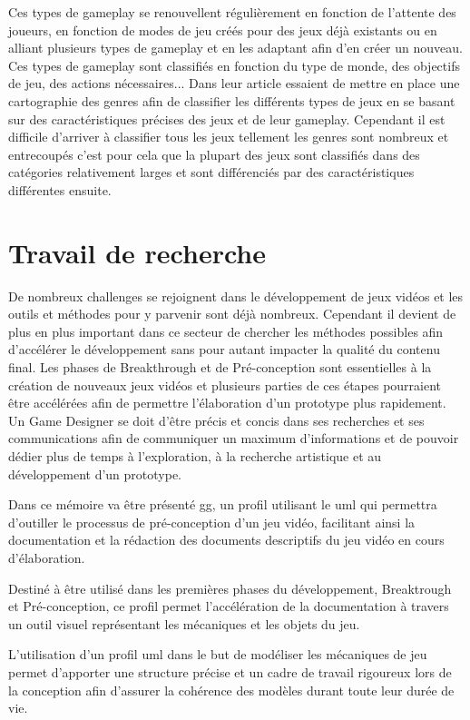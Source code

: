 Ces types de gameplay se renouvellent régulièrement en fonction de l'attente des joueurs, en fonction de modes de jeu créés pour des jeux déjà existants ou en alliant plusieurs types de gameplay et en les adaptant afin d'en créer un nouveau. Ces types de gameplay sont classifiés en fonction du type de monde, des objectifs de jeu, des actions nécessaires... Dans leur article \cite{HeintzStephanie2015TGGM} essaient de mettre en place une cartographie des genres afin de classifier les différents types de jeux en se basant sur des caractéristiques précises des jeux et de leur gameplay. Cependant il est difficile d'arriver à classifier tous les jeux tellement les genres sont nombreux et entrecoupés c'est pour cela que la plupart des jeux sont classifiés dans des catégories relativement larges et sont différenciés par des caractéristiques différentes ensuite.



\section{Travail de recherche}
De nombreux challenges se rejoignent dans le développement de jeux vidéos et les outils et méthodes pour y parvenir sont déjà nombreux. Cependant il devient de plus en plus important dans ce secteur de chercher les méthodes possibles afin d'accélérer le développement sans pour autant impacter la qualité du contenu final. Les phases de Breakthrough et de Pré-conception sont essentielles à la création de nouveaux jeux vidéos et plusieurs parties de ces étapes pourraient être accélérées afin de permettre l'élaboration d'un prototype plus rapidement. Un Game Designer se doit d'être précis et concis dans ses recherches et ses communications afin de communiquer un maximum d'informations et de pouvoir dédier plus de temps à l'exploration, à la recherche artistique et au développement d'un prototype. 

Dans ce mémoire va être présenté \gls{gg}, un profil utilisant le \gls{uml} qui permettra d'outiller le processus de pré-conception d'un jeu vidéo, facilitant ainsi la documentation et la rédaction des documents descriptifs du jeu vidéo en cours d'élaboration.

Destiné à être utilisé dans les premières phases du développement, Breaktrough et Pré-conception, ce profil permet l'accélération de la documentation à travers un outil visuel représentant les mécaniques et les objets du jeu. 

L'utilisation d'un profil \gls{uml} dans le but de modéliser les mécaniques de jeu permet d'apporter une structure précise et un cadre de travail rigoureux lors de la conception afin d'assurer la cohérence des modèles durant toute leur durée de vie.

